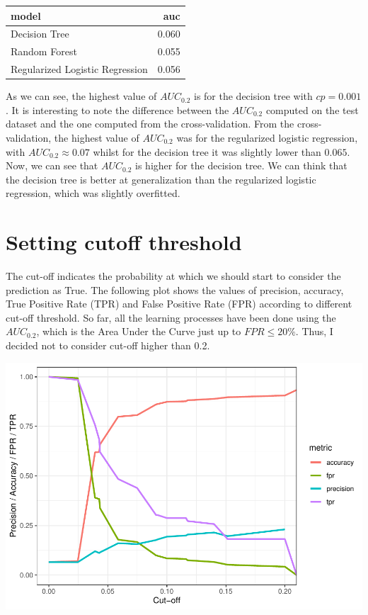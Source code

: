 \documentclass[
  12pt,
  oneside]{report}
\begin{document}
\begin{table}[H]
\centering
\begin{tabular}{l|r}
\hline
model & auc\\
\hline
Decision Tree & 0.060\\
\hline
Random Forest & 0.055\\
\hline
Regularized Logistic Regression & 0.056\\
\hline
\end{tabular}
\end{table}

As we can see, the highest value of \(AUC_{0.2}\) is for the decision tree with \(cp = 0.001\). It is interesting to note the difference between the \(AUC_{0.2}\) computed on the test dataset and the one computed from the cross-validation. From the cross-validation, the highest value of \(AUC_{0.2}\) was for the regularized logistic regression, with \(AUC_{0.2}\approx0.07\) whilst for the decision tree it was slightly lower than \(0.065\). Now, we can see that \(AUC_{0.2}\) is higher for the decision tree. We can think that the decision tree is better at generalization than the regularized logistic regression, which was slightly overfitted.

\hypertarget{setting-cutoff-threshold}{%
\section{Setting cutoff threshold}\label{setting-cutoff-threshold}}

The cut-off indicates the probability at which we should start to consider the prediction as True. The following plot shows the values of precision, accuracy, True Positive Rate (TPR) and False Positive Rate (FPR) according to different cut-off threshold. So far, all the learning processes have been done using the \(AUC_{0.2}\), which is the Area Under the Curve just up to \(FPR\leq20\%\). Thus, I decided not to consider cut-off higher than 0.2.

\includegraphics{leroy_francois_hw2_files/figure-latex/unnamed-chunk-19-1.pdf}
\end{document}
